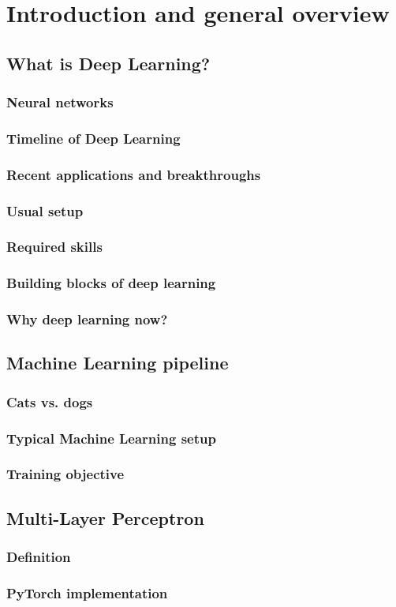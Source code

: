 \section{Introduction and general overview}
\subsection{What is Deep Learning?}
\subsubsection{Neural networks}
\subsubsection{Timeline of Deep Learning}
\subsubsection{Recent applications and breakthroughs}
\subsubsection{Usual setup}
\subsubsection{Required skills}
\subsubsection{Building blocks of deep learning}
\subsubsection{Why deep learning now?}

\subsection{Machine Learning pipeline}
\subsubsection{Cats vs. dogs}
\subsubsection{Typical Machine Learning setup}
\subsubsection{Training objective}

\subsection{Multi-Layer Perceptron}
\subsubsection{Definition}
\subsubsection{PyTorch implementation}